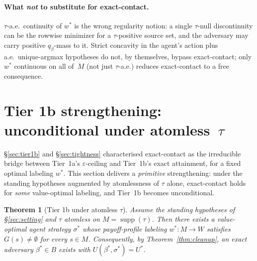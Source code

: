 \documentclass[11pt]{article}
\newtheorem{theorem}{Theorem}
\theoremstyle{definition}
\theoremstyle{remark}
\newcommand{\eps}{\varepsilon}
\newcommand{\suppset}{\operatorname{supp}}
\begin{document}
\paragraph{What \emph{not} to substitute for exact-contact.}
$\tau$-a.e.\ continuity of $w^*$ is the wrong regularity notion: a
single $\tau$-null discontinuity can be the rowwise minimizer for a
$\tau$-positive source set, and the adversary may carry positive
$q_\beta$-mass to it. Strict concavity in the agent's action plus
a.e.\ unique-argmax hypotheses do not, by themselves, bypass
exact-contact; only $w^*$ continuous on all of~$M$ (not just
$\tau$-a.e.) reduces exact-contact to a free consequence.

\section{Tier 1b strengthening: unconditional under atomless~$\tau$}\label{sec:tier1b-atomless}

\S\ref{sec:tier1b} and \S\ref{sec:tightness} characterised exact-contact as
the irreducible bridge between Tier~1a's $\eps$-ceiling and Tier~1b's
exact attainment, for a fixed optimal labeling $w^*$. This section
delivers a \emph{primitive} strengthening: under the standing
hypotheses augmented by atomlessness of $\tau$ alone, exact-contact
holds for \emph{some} value-optimal labeling, and Tier~1b becomes
unconditional.

\begin{theorem}[Tier 1b under atomless $\tau$]\label{thm:atomless-tier1b}
Assume the standing hypotheses of \S\ref{sec:setting} and $\tau$
atomless on $M = \suppset(\tau)$.
Then there exists a value-optimal agent strategy $\sigma^*$ whose
payoff-profile labeling $w^* : M \to W$ satisfies $G(s) \ne \emptyset$
for every $s \in M$. Consequently, by Theorem~\ref{thm:cleanup}, an
exact adversary $\beta^* \in B$ exists with $U(\beta^*, \sigma^*) = U^*$.
\end{theorem}
\end{document}
